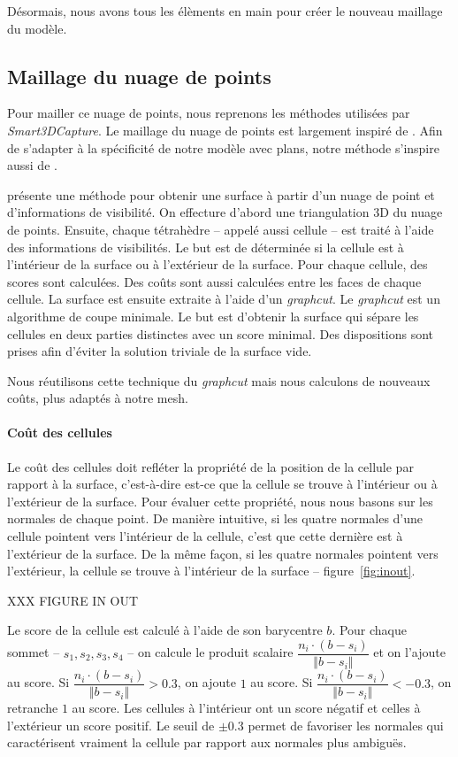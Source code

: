 ﻿\documentclass[12pt, twoside]{article}
\begin{document}
Désormais, nous avons tous les élèments en main pour créer le nouveau maillage du modèle.

\subsection{Maillage du nuage de points}
Pour mailler ce nuage de points, nous reprenons les méthodes utilisées par \textit{Smart3DCapture}. Le maillage du nuage de points est largement inspiré de \cite{maillage1}. Afin de s'adapter à la spécificité de notre modèle avec plans, notre méthode s'inspire aussi de \cite{maillage2}.

\cite{maillage1} présente une méthode pour obtenir une surface à partir d'un nuage de point et d'informations de visibilité. On effecture d'abord une triangulation 3D du nuage de points. Ensuite, chaque tétrahèdre -- appelé aussi cellule -- est traité à l'aide des informations de visibilités. Le but est de déterminée si la cellule est à l'intérieur de la surface ou à l'extérieur de la surface. Pour chaque cellule, des scores sont calculées. Des coûts sont aussi calculées entre les faces de chaque cellule. La surface est ensuite extraite à l'aide d'un \textit{graphcut}. Le \textit{graphcut} est un algorithme de coupe minimale. Le but est d'obtenir la surface qui sépare les cellules en deux parties distinctes avec un score minimal. Des dispositions sont prises afin d'éviter la solution triviale de la surface vide.

Nous réutilisons cette technique du \textit{graphcut} mais nous calculons de nouveaux coûts, plus adaptés à notre mesh.

\paragraph{Coût des cellules} Le coût des cellules doit refléter la propriété de la position de la cellule par rapport à la surface, c'est-à-dire est-ce que la cellule se trouve à l'intérieur ou à l'extérieur de la surface. Pour évaluer cette propriété, nous nous basons sur les normales de chaque point. De manière intuitive, si les quatre normales d'une cellule pointent vers l'intérieur de la cellule, c'est que cette dernière est à l'extérieur de la surface. De la même façon, si les quatre normales pointent vers l'extérieur, la cellule se trouve à l'intérieur de la surface -- figure~\ref{fig:inout}.

XXX FIGURE IN OUT

Le score de la cellule est calculé à l'aide de son barycentre $b$. Pour chaque sommet -- $s_1, s_2, s_3, s_4$ -- on calcule le produit scalaire $\dfrac{n_i\cdot(b-s_i)}{\Vert b-s_i\Vert}$ et on l'ajoute au score. Si $\dfrac{n_i\cdot(b-s_i)}{\Vert b-s_i\Vert} > 0.3$, on ajoute $1$ au score. Si $\dfrac{n_i\cdot(b-s_i)}{\Vert b-s_i\Vert} < -0.3$, on retranche $1$ au score. Les cellules à l'intérieur ont un score négatif et celles à l'extérieur un score positif. Le seuil de $\pm 0.3$ permet de favoriser les normales qui caractérisent vraiment la cellule par rapport aux normales plus ambiguës.
\end{document}
